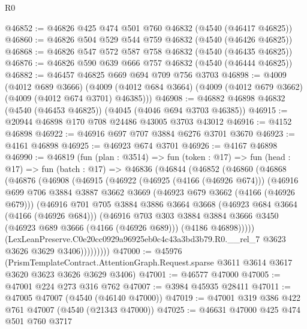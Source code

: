 \begin{lexlean}{R0}
\begin{coremodule}
@46852 := @46826 @425 @474 @501 @760 @46832 (@4540 (@46417 @46825))
@46860 := @46826 @504 @529 @544 @759 @46832 (@4540 (@46426 @46825))
@46868 := @46826 @547 @572 @587 @758 @46832 (@4540 (@46435 @46825))
@46876 := @46826 @590 @639 @666 @757 @46832 (@4540 (@46444 @46825))
@46882 := @46457 @46825 @669 @694 @709 @756 @3703
@46898 := @4009
    (@4012 @689 @3666)
    (@4009 (@4012 @684 @3664) (@4009 (@4012 @679 @3662) (@4009 (@4012 @674 @3701) @46385)))
@46908 := @46882 @46898 @46832 (@4540 (@46453 @46825)) (@4045 (@4046 @694 @3703 @46385))
@46915 := @20944 @46898 @170 @708 @24486 @43005 @3703 @43012
@46916 := @4152 @46898
@46922 := @46916 @697 @707 @3884 @6276 @3701 @3670
@46923 := @4161 @46898
@46925 := @46923 @674 @3701
@46926 := @4167 @46898
@46990 := @46819
    (fun (plan : @3514) =>
    fun (token : @17) =>
    fun (head : @17) =>
    fun (batch : @17) =>
    @46836
      (@46844
        (@46852
          (@46860
            (@46868
              (@46876
                (@46908
                  (@46915
                    (@46922
                      (@46925 (@4166 (@46926 @674)))
                      (@46916
                        @699
                        @706
                        @3884
                        @3887
                        @3662
                        @3669
                        (@46923 @679 @3662 (@4166 (@46926 @679)))
                        (@46916
                          @701
                          @705
                          @3884
                          @3886
                          @3664
                          @3668
                          (@46923 @684 @3664 (@4166 (@46926 @684)))
                          (@46916
                            @703
                            @303
                            @3884
                            @3884
                            @3666
                            @3450
                            (@46923 @689 @3666 (@4166 (@46926 @689)))
                            (@4186 @46898)))))
                    (LexLeanPreserve.C0e20cc0929a96925eb0c4c43a3bd3b79.R0.__rel_7
                      @3623
                      @3626
                      @3629
                      @3406)))))))))
@47000 := @45976
    (PrismTemplateContract.AttentionGraph.Request.sparse
      @3611
      @3614
      @3617
      @3620
      @3623
      @3626
      @3629
      @3406)
@47001 := @46577 @47000
@47005 := @47001 @224 @273 @316 @762
@47007 := @3984 @45935 @28411
@47011 := @47005 @47007 (@4540 (@46140 @47000))
@47019 := @47001 @319 @386 @422 @761 @47007 (@4540 (@21343 @47000))
@47025 := @46631 @47000 @425 @474 @501 @760 @3717

\end{coremodule}
\end{lexlean}
